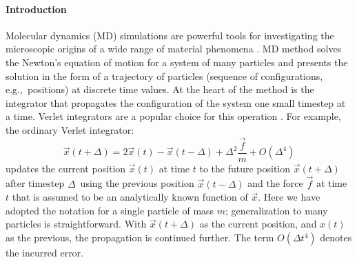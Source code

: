 \documentclass[aps,prl,twocolumn,superscriptaddress,tightenlines,longbibliography, reprint]{revtex4-1}
\newcommand{\eg}{e.g.,}
\newcommand{\dt}{$\Delta$}
\begin{document}
\paragraph{Introduction}
Molecular dynamics (MD) simulations are powerful tools for investigating the microscopic origins of a wide range of material phenomena \cite{frenkel,glotzer2015assembly,brunk2019computational,beckstein2004not,qiao2004charge,hadden2018all}.
MD method solves the Newton's equation of motion for a system of many particles and presents the solution in the form of a trajectory of particles (sequence of configurations, \eg\ positions) at discrete time values. At the heart of the method is the integrator that propagates the configuration of the system one small timestep at a time. Verlet integrators are a popular choice for this operation \cite{verlet1967computer}. 
For example, the ordinary Verlet integrator:
\begin{equation} \label{eq:ov}
    \vec{x}(t + \Delta) = 2\vec{x}(t) - \vec{x}(t-\Delta) +
\Delta^2 \frac{\vec{f}}{m} + O(\Delta^4)
\end{equation}
updates the current position $\vec{x}(t)$ at time $t$  to the future position $\vec{x}(t + \Delta)$ after timestep \dt\ using the previous position $\vec{x}(t - \Delta)$ and the force $\vec{f}$ at time $t$ that is assumed to be an analytically known function of $\vec{x}$. Here we have adopted the notation for a single particle of mass $m$; generalization to many particles is straightforward.
With $\vec{x}(t +\Delta)$ as the current position, and $x(t)$ as the previous, the propagation is continued further. 
The term $O(\Delta t^4)$ denotes the incurred error. 
\end{document}
